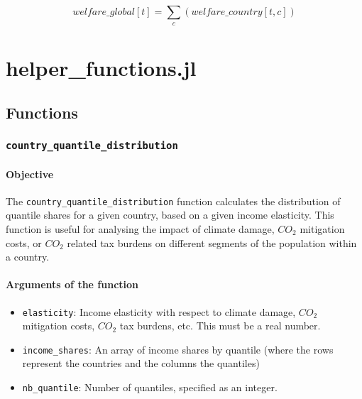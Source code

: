 \documentclass[
]{article}
\providecommand{\tightlist}{%
  \setlength{\itemsep}{0pt}\setlength{\parskip}{0pt}}
\begin{document}
\begin{equation}
  welfare\_global[t] = \sum_c (welfare\_country[t,c])
\end{equation}

\section{helper\_functions.jl}\label{helper_functions.jl}

\subsection{Functions}\label{functions}

\subsubsection{\texorpdfstring{\texttt{country\_quantile\_distribution}}{Country\_quantile\_distribution}} \label{countryquantiledistribution}

\paragraph{Objective}\label{objective}

The \texttt{country\_quantile\_distribution} function calculates the
distribution of quantile shares for a given country, based on a given
income elasticity. This function is useful for analysing the impact of
climate damage, $CO_2$ mitigation costs, or $CO_2$ related tax burdens on
different segments of the population within a country.

\paragraph{Arguments of the
function}\label{arguments-of-the-function}

\begin{itemize}
\tightlist
\item
  \texttt{elasticity}: Income elasticity with respect to climate damage,
  $CO_2$ mitigation costs, $CO_2$ tax burdens, etc. This must be a real
  number.
\item
  \texttt{income\_shares}: An array of income shares by quantile (where
  the rows represent the countries and the columns the quantiles)
\item
  \texttt{nb\_quantile}: Number of quantiles, specified as an integer.
\end{itemize}
\end{document}

